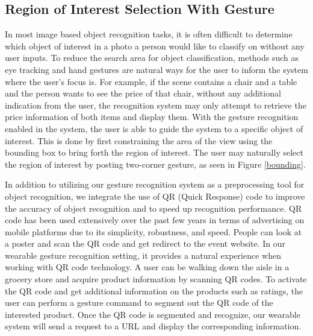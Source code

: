 \subsection{Region of Interest Selection With Gesture}
In most image based object recognition tasks, it is often difficult to determine which object of interest in a photo a person would like to classify on without any user inputs. To reduce the search area for object classification, methods such as eye tracking \cite{schiessl2003eye} and hand gestures are natural ways for the user to inform the system where the user's focus is. For example, if the scene contains a chair and a table and the person wants to see the price of that chair, without any additional indication from the user, the recognition system may only attempt to retrieve the price information of both items and display them. With the gesture recognition enabled in the system, the user is able to guide the system to a specific object of interest. This is done by first constraining the area of the view using the bounding box to bring forth the region of interest. The user may naturally select the region of interest by posting two-corner gesture, as seen in Figure \ref{bounding}.

In addition to utilizing our gesture recognition system as a preprocessing tool for object recognition, we integrate the use of QR (Quick Response) code to improve the accuracy of object recognition and to speed up recognition performance. QR code has been used extensively over the past few years in terms of advertising on mobile platforms due to its simplicity, robustness, and speed. People can look at a poster and scan the QR code and get redirect to the event website. In our wearable gesture recognition setting, it provides a natural experience when working with QR code technology. A user can be walking down the aisle in a grocery store and acquire product information by scanning QR codes. To activate the QR code and get additional information on the products such as ratings, the user can perform a gesture command to segment out the QR code of the interested product. Once the QR code is segmented and recognize, our wearable system will send a request to a URL and display the corresponding information. 

